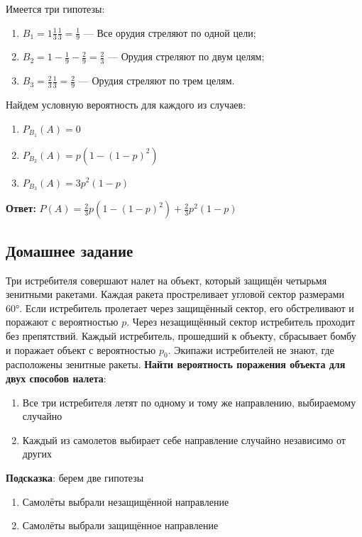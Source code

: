 \documentclass{article}
\begin{document}
Имеется три гипотезы:

\begin{enumerate}
    \item $B_1 = 1 \frac{1}{3} \frac{1}{3} = \frac{1}{9}$ — Все орудия стреляют по одной цели;
    \item $B_2 = 1 - \frac{1}{9} - \frac{2}{9} = \frac{2}{3}$ — Орудия стреляют по двум целям;
    \item $B_3 = \frac{2}{3} \frac{1}{3} = \frac{2}{9}$ — Орудия стреляют по трем целям.
\end{enumerate}

Найдем условную вероятность для каждого из случаев:

\begin{enumerate}
    \item $P_{B_1}(A) = 0$
    \item $P_{B_2}(A) = p (1 - (1 - p)^2)$
    \item $P_{B_3}(A) = 3p^2 (1 - p)$
\end{enumerate}

\textbf{Ответ:} $P(A) = \frac{2}{3} p (1 - (1 - p)^2) + \frac{2}{3} p^2 (1 - p)$

\subsection{Домашнее задание}

Три истребителя совершают налет на объект, который защищён четырьмя зенитными ракетами. Каждая ракета простреливает угловой сектор размерами 60°. Если истребитель пролетает через защищённый сектор, его обстреливают и поражают с вероятностью $p$. Через незащищённый сектор истребитель проходит без препятствий. Каждый истребитель, прошедший к объекту, сбрасывает бомбу и поражает объект с вероятностью $p_0$. Экипажи истребителей не знают, где расположены зенитные ракеты. \textbf{Найти вероятность поражения объекта для двух способов налета}:

\begin{enumerate}
    \item Все три истребителя летят по одному и тому же направлению, выбираемому случайно
    \item Каждый из самолетов выбирает себе направление случайно независимо от других
\end{enumerate}

\textbf{Подсказка}: берем две гипотезы

\begin{enumerate}
    \item Самолёты выбрали незащищённой направление
    \item Самолёты выбрали защищённое направление
\end{enumerate}
\end{document}
